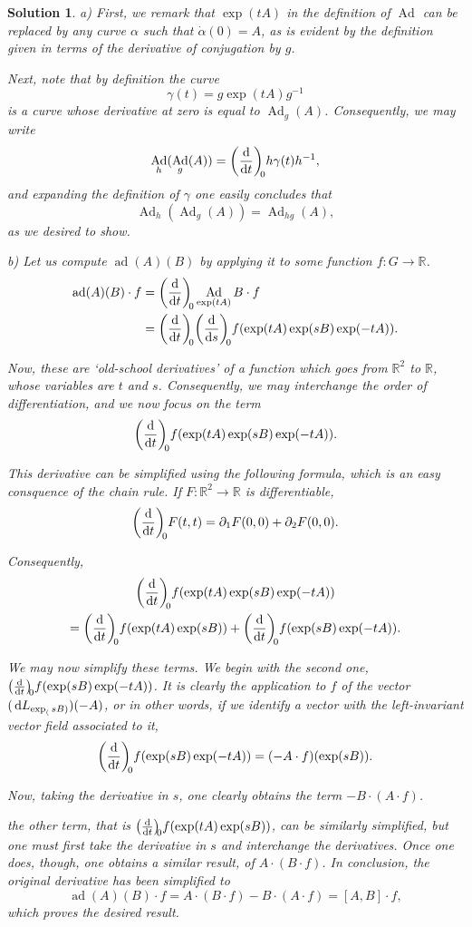 \documentclass{article}
\theoremstyle{nonumberplain}
\newtheorem{sol}{Solution}
\newcommand{\R}{\mathbb{R}}
\DeclareMathOperator{\Ad}{Ad}
\DeclareMathOperator{\ad}{ad}
\begin{document}
\begin{sol}
a) First, we remark that $\exp(tA)$ in the definition of $\Ad$ can be replaced by any curve $\alpha$ such that $\dot\alpha(0) = A$, as is evident by the definition given in terms of the derivative of conjugation by $g$.

Next, note that by definition the curve
\[\gamma(t) = g \exp(tA) g^{-1}\]
is a curve whose derivative at zero is equal to $\Ad_g(A)$. Consequently, we may write
\[\Ad_h(\Ad_g(A)) = \diff{}t[0] h \gamma(t) h^{-1},\]
and expanding the definition of $\gamma$ one easily concludes that
\[\Ad_h(\Ad_g(A)) = \Ad_{hg}(A),\]
as we desired to show.

\medskip

b) Let us compute $\ad(A)(B)$ by applying it to some function $f \colon G \to \R$.
\begin{align*}
\ad(A)(B)\cdot f &= \diff{}t[0] \Ad_{\exp(tA)}B \cdot f\\
&= \diff{}t[0] \diff{}s[0] f(\exp(tA) \exp(sB) \exp(-tA)).
\end{align*}

Now, these are `old-school derivatives' of a function which goes from $\R^2$ to $\R$, whose variables are $t$ and $s$. Consequently, we may interchange the order of differentiation, and we now focus on the term
\[\diff{}t[0] f(\exp(tA) \exp(sB) \exp(-tA)).\]

This derivative can be simplified using the following formula, which is an easy consquence of the chain rule. If $F \colon \R^2 \to \R$ is differentiable,
\[\diff{}t[0] F(t,t) = \partial_1 F(0,0) + \partial_2 F(0,0).\]

Consequently,
\begin{multline*}
\diff{}t[0] f(\exp(tA) \exp(sB) \exp(-tA))\\
= \diff{}t[0] f(\exp(tA) \exp(sB)) + \diff{}t[0] f(\exp(sB) \exp(-tA)).
\end{multline*}

We may now simplify these terms. We begin with the second one, $\diff{}t[0] f(\exp(sB) \exp(-tA))$. It is clearly the application to $f$ of the vector $(\dl L_{\exp_(sB)}) (-A)$, or in other words, if we identify a vector with the left-invariant vector field associated to it,
\[\diff{}t[0] f(\exp(sB) \exp(-tA)) = (-A \cdot f)(\exp(sB)).\]

Now, taking the derivative in $s$, one clearly obtains the term $-B \cdot (A \cdot f)$.

the other term, that is $\diff{}t[0] f(\exp(tA) \exp(sB))$, can be similarly simplified, but one must first take the derivative in $s$ and interchange the derivatives. Once one does, though, one obtains a similar result, of $A \cdot (B \cdot f)$. In conclusion, the original derivative has been simplified to
\[\ad(A)(B)\cdot f = A \cdot (B \cdot f) - B \cdot (A \cdot f) = [A,B] \cdot f,\]
which proves the desired result.

\end{sol}
\end{document}
